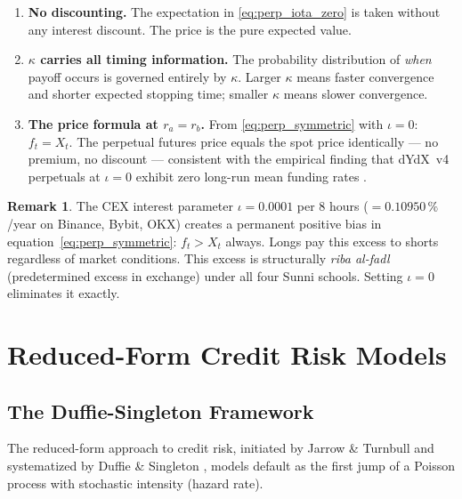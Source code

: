 \documentclass[10pt,twocolumn]{article}
\theoremstyle{plain}
\theoremstyle{definition}
\newtheorem{remark}{Remark}
\begin{document}
\begin{enumerate}[leftmargin=*,noitemsep]
\item \textbf{No discounting.} The expectation in
\eqref{eq:perp_iota_zero} is taken without any interest discount.
The price is the pure expected value.

\item \textbf{$\kappa$ carries all timing information.} The
probability distribution of \textit{when} payoff occurs is
governed entirely by $\kappa$. Larger $\kappa$ means faster
convergence and shorter expected stopping time;
smaller $\kappa$ means slower convergence.

\item \textbf{The price formula at $r_a = r_b$.}
From \eqref{eq:perp_symmetric} with $\iota = 0$: $f_t = X_t$.
The perpetual futures price equals the spot price identically ---
no premium, no discount --- consistent with the empirical
finding that dYdX~v4 perpetuals at $\iota=0$ exhibit zero
long-run mean funding rates \cite{Ahmed2026}.
\end{enumerate}

\begin{remark}
The CEX interest parameter $\iota = 0.0001$ per 8 hours
($= 0.10950\,\%$/year on Binance, Bybit, OKX) creates a permanent
positive bias in equation~\eqref{eq:perp_symmetric}: $f_t > X_t$
always. Longs pay this excess to shorts regardless of market
conditions. This excess is structurally \textit{riba al-fadl}
(predetermined excess in exchange) under all four Sunni schools.
Setting $\iota = 0$ eliminates it exactly.
\end{remark}

\section{Reduced-Form Credit Risk Models}
\label{sec:credit}

\subsection{The Duffie-Singleton Framework}

The reduced-form approach to credit risk, initiated by Jarrow \&
Turnbull \cite{JarrowTurnbull1995} and systematized by Duffie \&
Singleton \cite{DuffieSingleton1999}, models default as the first
jump of a Poisson process with stochastic intensity (hazard rate).
\end{document}
